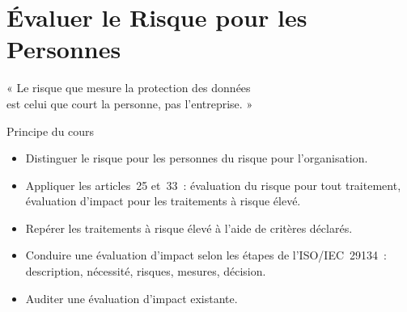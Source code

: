 
\chapter{Évaluer le Risque pour les Personnes}
\label{chap:risque}

\epigraph{%
    « Le risque que mesure la protection des données\\
    est celui que court la personne, pas l'entreprise. »%
}{Principe du cours}


\begin{boxobjectifs}
\begin{itemize}
    \item Distinguer le risque pour les personnes du risque pour
          l'organisation.
    \item Appliquer les articles~25 et~33~: évaluation du risque pour tout
          traitement, évaluation d'impact pour les traitements à risque
          élevé.
    \item Repérer les traitements à risque élevé à l'aide de critères
          déclarés.
    \item Conduire une évaluation d'impact selon les étapes de
          l'ISO/IEC~29134~: description, nécessité, risques, mesures,
          décision.
    \item Auditer une évaluation d'impact existante.
\end{itemize}
\end{boxobjectifs}

\bigskip

